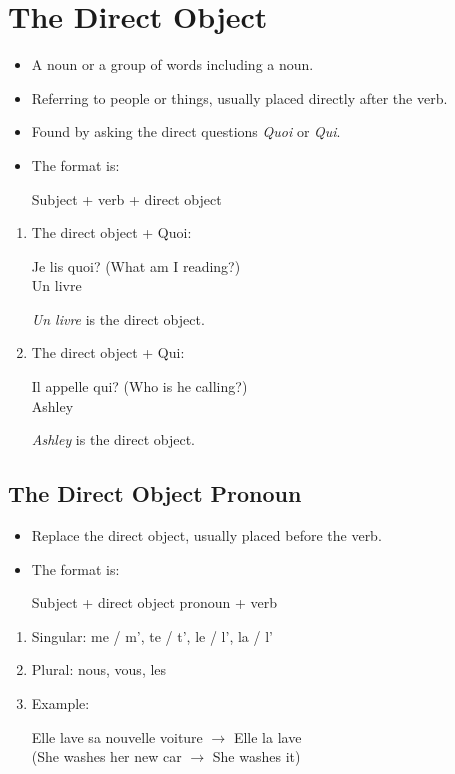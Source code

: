 \documentclass{book}
\begin{document}
\chapter{The Direct Object}
    \begin{itemize}
        \item A noun or a group of words including a noun.
        \item Referring to people or things, usually placed directly after the verb.
        \item Found by asking the direct questions \textit{Quoi} or \textit{Qui}.
        \item The format is:
            \begin{center}
                Subject + verb + direct object
            \end{center}
    \end{itemize}
    \begin{enumerate}
        \item The direct object + Quoi:
            \begin{center}
                Je lis quoi? (What am I reading?) \\
                Un livre
            \end{center}
            \textit{Un livre} is the direct object.

        \item The direct object + Qui:
            \begin{center}
                Il appelle qui? (Who is he calling?) \\
                Ashley
            \end{center}
            \textit{Ashley} is the direct object.
    \end{enumerate}

    \section{The Direct Object Pronoun}
        \begin{itemize}
            \item Replace the direct object, usually placed before the verb.
            \item The format is:
                \begin{center}
                    Subject + direct object pronoun + verb
                \end{center}
        \end{itemize}
        \begin{enumerate}
            \item Singular: me / m', te / t', le / l', la / l'
            \item Plural: nous, vous, les
            \item Example:
                \begin{center}
                    Elle lave sa nouvelle voiture $\to$ Elle la lave \\
                    (She washes her new car $\to$ She washes it)
                \end{center}
        \end{enumerate}
\end{document}
